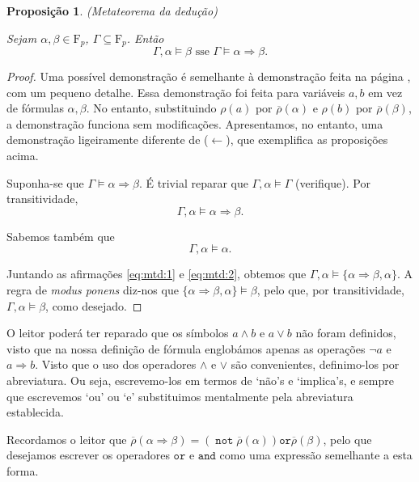 \documentclass{report}
\newtheorem{prop}{Proposição}
\theoremstyle{definition}
\theoremstyle{remark}
\newcommand{\F}{\mathrm{F}}
\DeclareMathOperator{\pnot}{\texttt{not}}
\newcommand{\pand}{\mathbin{\texttt{and}}}
\newcommand{\por}{\mathbin{\texttt{or}}}
\newcommand{\imply}{\mathbin{\Rightarrow}}
\begin{document}
	\begin{prop}
	(Metateorema da dedução)
	
	Sejam $\alpha, \beta \in \F_p$, $\Gamma \subseteq \F_p$. Então
	\[\Gamma, \alpha \vDash \beta \text{ sse } \Gamma \vDash \alpha \imply \beta.\]
	\end{prop}
	
	\begin{proof}
	Uma possível demonstração é semelhante à demonstração feita na página \pageref{dem:mtd}, com um pequeno detalhe. Essa demonstração foi feita para variáveis $a, b$ em vez de fórmulas $\alpha, \beta$. No entanto, substituindo $\rho(a)$ por $\overline\rho(\alpha)$ e $\rho(b)$ por $\overline\rho(\beta)$, a demonstração funciona sem modificações. Apresentamos, no entanto, uma demonstração ligeiramente diferente de ($\leftarrow$), que exemplifica as proposições acima.
	
	Suponha-se que $\Gamma \vDash \alpha \imply \beta$. É trivial reparar que $\Gamma, \alpha \vDash \Gamma$ (verifique). Por transitividade,
	\begin{equation}\label{eq:mtd:1}
	\Gamma, \alpha \vDash \alpha \imply \beta.
	\end{equation}
	
	Sabemos também que
	\begin{equation}\label{eq:mtd:2}
	\Gamma, \alpha \vDash \alpha.
	\end{equation}
	
	Juntando as afirmações \eqref{eq:mtd:1} e \eqref{eq:mtd:2}, obtemos que $\Gamma, \alpha \vDash \{\alpha \imply \beta, \alpha\}$. A regra de \textit{modus ponens} diz-nos que $\{\alpha \imply \beta, \alpha\} \vDash \beta$, pelo que, por transitividade, $\Gamma, \alpha \vDash \beta$, como desejado.
	\end{proof}
	
	O leitor poderá ter reparado que os símbolos $a \land b$ e $a \lor b$ não foram definidos, visto que na nossa definição de fórmula englobámos apenas as operações $\neg a$ e $a \imply b$. Visto que o uso dos operadores $\land$ e $\lor$ são convenientes, definimo-los por abreviatura. Ou seja, escrevemo-los em termos de `não's e `implica's, e sempre que escrevemos `ou' ou `e' substituimos mentalmente pela abreviatura establecida.
	
	Recordamos o leitor que $\overline\rho(\alpha \imply \beta) = (\pnot \overline\rho(\alpha)) \por \overline\rho(\beta)$, pelo que desejamos escrever os operadores $\por$ e $\pand$ como uma expressão semelhante a esta forma.
	
\end{document}
